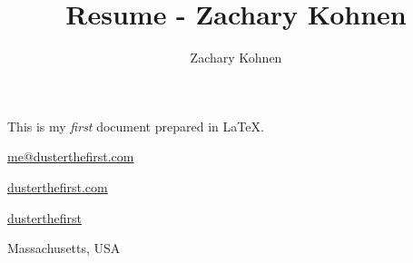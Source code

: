 \documentclass[a4paper,12pt,twocolumn]{article}
\title{Resume - Zachary Kohnen}
\author{Zachary Kohnen}
\begin{document}
This is my \emph{first} document prepared in \LaTeX.

\faAt \href{mailto:me@dusterthefirst.com}{me@dusterthefirst.com}

\faGlobe \href{https://dusterthefirst.com}{dusterthefirst.com}

\faGithub \href{https://github.com/dusterthefirst}{dusterthefirst}

\faMapMarker Massachusetts, USA
\end{document}
